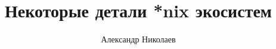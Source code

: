 \documentclass[a4paper, 14 pt, final]{extarticle}
\begin{document}
%
\title{Некоторые детали *nix экосистем}

\author{Александр Николаев}

\maketitle

\newpage
{}
\setcounter{tocdepth}{5}
\setcounter{secnumdepth}{5}
\tableofcontents
\newpage
















\appendix











\end{document}
